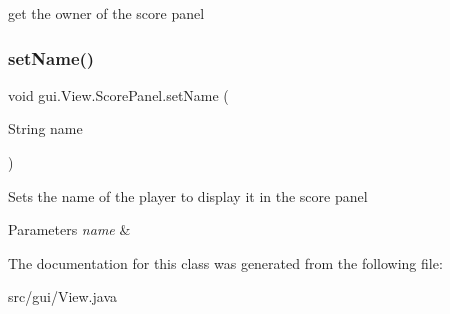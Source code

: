 get the owner of the score panel \mbox{\label{classgui_1_1_view_1_1_score_panel_a3dd245187918d98e62c6059980528cd7}} 
\subsubsection{\texorpdfstring{set\+Name()}{setName()}}
{\footnotesize\ttfamily void gui.\+View.\+Score\+Panel.\+set\+Name (\begin{DoxyParamCaption}\item[{String}]{name }\end{DoxyParamCaption})}

Sets the name of the player to display it in the score panel 
\begin{DoxyParams}{Parameters}
{\em name} & \\
\hline
\end{DoxyParams}


The documentation for this class was generated from the following file\+:\begin{DoxyCompactItemize}
\item 
src/gui/View.\+java\end{DoxyCompactItemize}
